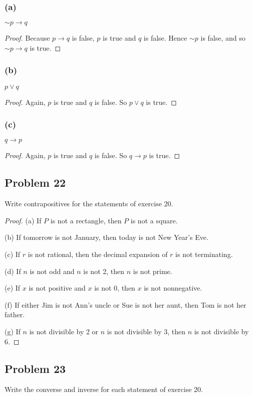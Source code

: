 \documentclass[14pt]{extarticle}
\begin{document}
\subsubsection{(a)}
${\sim p} \to q$

\begin{proof}
Because $p \to q$ is false, $p$ is true and $q$ is false. Hence ${\sim p}$ is false, and so ${\sim p} \to q$ is true.
\end{proof}

\subsubsection{(b)}
$p \vee q$

\begin{proof}
Again, $p$ is true and $q$ is false. So $p \vee q$ is true.
\end{proof}

\subsubsection{(c)}
$q \to p$

\begin{proof}
Again, $p$ is true and $q$ is false. So $q \to p$ is true.
\end{proof}

\subsection{Problem 22}
Write contrapositives for the statements of exercise 20.

\begin{proof}
(a) If $P$ is not a rectangle, then $P$ is not a square.

(b) If tomorrow is not January, then today is not New Year’s Eve.

(c) If $r$ is not rational, then the decimal expansion of $r$ is not terminating.

(d) If $n$ is not odd and $n$ is not 2, then $n$ is not prime.

(e) If $x$ is not positive and $x$ is not 0, then $x$ is not nonnegative.

(f) If either Jim is not Ann’s uncle or Sue is not her aunt, then Tom is not her father.

(g) If $n$ is not divisible by 2 or $n$ is not divisible by 3, then $n$ is not divisible by 6.
\end{proof}

\subsection{Problem 23}
Write the converse and inverse for each statement of exercise 20.
\end{document}
